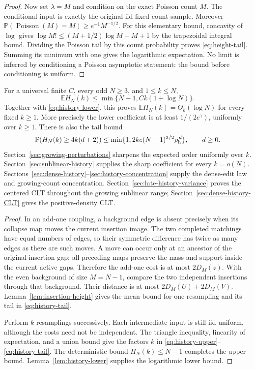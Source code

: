 \documentclass[11pt,letterpaper]{article}
\newcommand{\PP}{\mathbb P}\newcommand{\EE}{\mathbb E}
\begin{document}
\begin{proof}
Now set $\lambda=M$ and condition on the exact Poisson count $M$.
The conditional input is exactly the original iid fixed-count sample.
Moreover
$\PP(\operatorname{Poisson}(M)=M)\ge e^{-1}M^{-1/2}$.
For this elementary bound, concavity of $\log$ gives
$\log M!\le(M+1/2)\log M-M+1$ by the trapezoidal integral bound.
Dividing the Poisson tail by this count probability proves
\eqref{eq:height-tail}. Summing its minimum with one gives the
logarithmic expectation. No limit is inferred by conditioning a
Poisson asymptotic statement: the bound before conditioning is uniform.
\end{proof}

\begin{theorem}
\label{thm:logarithmic-history}
For a universal finite $C$, every odd $N\ge3$, and $1\le k\le N$,
\begin{equation}\label{eq:history-upper}
 \EE H_N(k)\le\min\{N-1,Ck(1+\log N)\}.
\end{equation}
Together with \eqref{eq:history-lower}, this proves
$\EE H_N(k)=\Theta_k(\log N)$ for every fixed $k\ge1$.
More precisely the lower coefficient is at least
$1/(2e^\gamma)$, uniformly over $k\ge1$.
There is also the tail bound
\begin{equation}\label{eq:history-tail}
 \PP(H_N(k)\ge4k(d+2))
 \le\min\{1,2ke(N-1)^{3/2}\rho_{\rm h}^{\,d}\},\qquad d\ge0.
\end{equation}
Section~\ref{sec:growing-perturbations} sharpens the expected order
uniformly over $k$. Section~\ref{sec:sublinear-history} supplies the
sharp coefficient for every $k=o(N)$.
Sections~\ref{sec:dense-history}--\ref{sec:history-concentration}
supply the dense-edit law and growing-count concentration.
Section~\ref{sec:late-history-variance} proves the centered CLT
throughout the growing sublinear range;
Section~\ref{sec:dense-history-CLT} gives the positive-density CLT.
\end{theorem}
\begin{proof}
In an add-one coupling, a background edge is absent precisely when
its collapse map moves the current insertion image. The two completed
matchings have equal numbers of edges, so their symmetric difference
has twice as many edges as there are such moves.
A move can occur only at an ancestor of the original insertion gap:
all preceding maps preserve the mass and support inside the current
active gaps. Therefore the add-one cost is at most $2D_M(z)$.
With the even background of size $M=N-1$, compare the two independent
insertions through that background. Their distance is at most
$2D_M(U)+2D_M(V)$. Lemma~\ref{lem:insertion-height} gives the mean
bound for one resampling and its tail in \eqref{eq:history-tail}.

Perform $k$ resamplings successively. Each intermediate input is still
iid uniform, although the costs need not be independent. The triangle
inequality, linearity of expectation, and a union bound give the
factors $k$ in \eqref{eq:history-upper}--\eqref{eq:history-tail}.
The deterministic bound $H_N(k)\le N-1$ completes the upper bound.
Lemma~\ref{lem:history-lower} supplies the logarithmic lower bound.
\end{proof}
\end{document}
